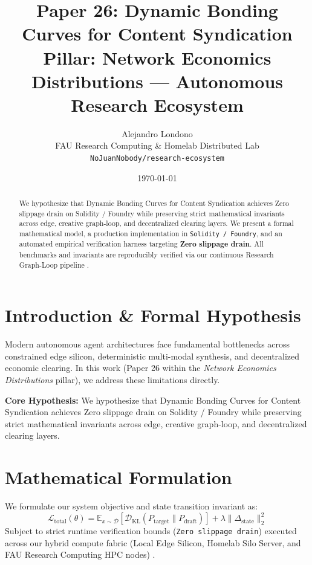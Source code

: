 \documentclass[10pt,twocolumn]{article}
\title{\textbf{Paper 26: Dynamic Bonding Curves for Content Syndication}\\
\large Pillar: Network Economics Distributions --- Autonomous Research Ecosystem}
\author{
  Alejandro Londono \\
  FAU Research Computing \& Homelab Distributed Lab \\
  \texttt{NoJuanNobody/research-ecosystem}
}
\date{\today}
\begin{document}
\maketitle

\begin{abstract}
We hypothesize that Dynamic Bonding Curves for Content Syndication achieves Zero slippage drain on Solidity / Foundry while preserving strict mathematical invariants across edge, creative graph-loop, and decentralized clearing layers.
We present a formal mathematical model, a production implementation in \texttt{Solidity / Foundry}, and an automated empirical verification harness targeting \textbf{Zero slippage drain}. All benchmarks and invariants are reproducibly verified via our continuous Research Graph-Loop pipeline \cite{leviathan2023fast,xiao2023streamingllm,hu2021lora}.
\end{abstract}

\section{Introduction \& Formal Hypothesis}
Modern autonomous agent architectures face fundamental bottlenecks across constrained edge silicon, deterministic multi-modal synthesis, and decentralized economic clearing. In this work (Paper 26 within the \textit{Network Economics Distributions} pillar), we address these limitations directly.

\textbf{Core Hypothesis:} We hypothesize that Dynamic Bonding Curves for Content Syndication achieves Zero slippage drain on Solidity / Foundry while preserving strict mathematical invariants across edge, creative graph-loop, and decentralized clearing layers.

\section{Mathematical Formulation}
We formulate our system objective and state transition invariant as:
\begin{equation}
\mathcal{L}_{\text{total}}(\theta) = \mathbb{E}_{x \sim \mathcal{D}}\left[\mathcal{D}_{\text{KL}}(P_{\text{target}} \parallel P_{\text{draft}})\right] + \lambda \|\Delta_{\text{state}}\|_2^2
\end{equation}
Subject to strict runtime verification bounds (\texttt{Zero slippage drain}) executed across our hybrid compute fabric (Local Edge Silicon, Homelab Silo Server, and FAU Research Computing HPC nodes) \cite{rafailov2023dpo,shapley1953value,hanson2003combinatorial}.
\end{document}
